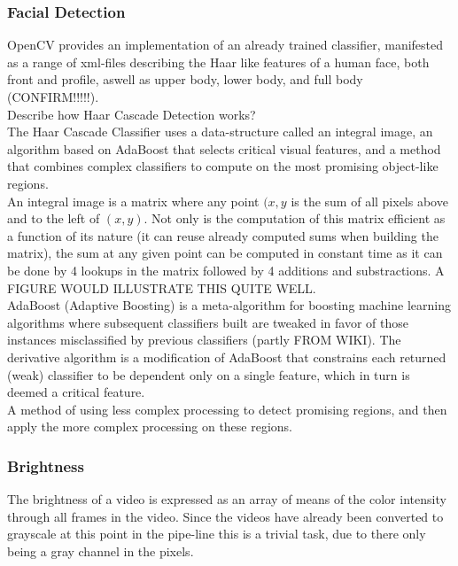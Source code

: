 \subsubsection{Facial Detection}
%
OpenCV provides an implementation of an already trained classifier, manifested as a range of xml-files describing the Haar like features of a human face, both front and profile, aswell as upper body, lower body, and full body (CONFIRM!!!!!).\\
Describe how Haar Cascade Detection works?\\
The Haar Cascade Classifier uses a data-structure called an integral image, an algorithm based on AdaBoost that selects critical visual features, and a method that combines complex classifiers to compute on the most promising object-like regions.\\
An integral image is a matrix where any point $(x,y$ is the sum of all pixels above and to the left of $(x,y)$. Not only is the computation of this matrix efficient as a function of its nature (it can reuse already computed sums when building the matrix), the sum at any given point can be computed in constant time as it can be done by 4 lookups in the matrix followed by 4 additions and substractions. A FIGURE WOULD ILLUSTRATE THIS QUITE WELL.\\
AdaBoost (Adaptive Boosting) is a meta-algorithm for boosting machine learning algorithms where subsequent classifiers built are tweaked in favor of those instances misclassified by previous classifiers (partly FROM WIKI). The derivative algorithm is a modification of AdaBoost that constrains each returned (weak) classifier to be dependent only on a single feature, which in turn is deemed a critical feature.\\
A method of using less complex processing to detect promising regions, and then apply the more complex processing on these regions.
%
\subsubsection{Brightness}
%
The brightness of a video is expressed as an array of means of the color intensity through all frames in the video. Since the videos have already been converted to grayscale at this point in the pipe-line this is a trivial task, due to there only being a gray channel in the pixels.
%

